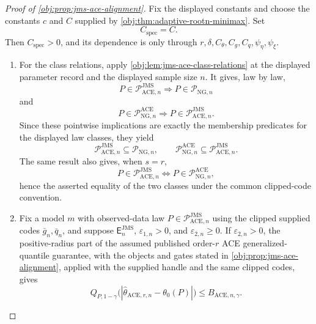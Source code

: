 \begin{proof}[Proof of \cref{obj:prop:jms-ace-alignment}]
Fix the displayed constants and choose the constants \(c\) and \(C\) supplied by
\cref{obj:thm:adaptive-rootn-minimax}.  Set
\[
  C_{\mathrm{spec}}=C .
\]
Then \(C_{\mathrm{spec}}>0\), and its dependence is only through
\(r,\delta,C_{\theta},C_g,C_q,\psi_{\eta},\psi_{\xi}\).

\begin{enumerate}
\item For the class relations, apply \cref{obj:lem:jms-ace-class-relations} at
the displayed parameter record and the displayed sample size \(n\).  It gives,
law by law,
\[
  P\in\mathcal P_{\mathrm{ACE},n}^{\mathrm{JMS}}
  \Longrightarrow
  P\in\mathcal P_{\mathrm{NG},n}
\]
and
\[
  P\in\mathcal P_{\mathrm{NG},n}^{\mathrm{ACE}}
  \Longrightarrow
  P\in\mathcal P_{\mathrm{ACE},n}^{\mathrm{JMS}} .
\]
Since these pointwise implications are exactly the membership predicates for
the displayed law classes, they yield
\[
 \mathcal P_{\mathrm{ACE},n}^{\mathrm{JMS}}
 \subseteq \mathcal P_{\mathrm{NG},n},
 \qquad
 \mathcal P_{\mathrm{NG},n}^{\mathrm{ACE}}
 \subseteq \mathcal P_{\mathrm{ACE},n}^{\mathrm{JMS}} .
\]
The same result also gives, when \(s=r\),
\[
  P\in\mathcal P_{\mathrm{ACE},n}^{\mathrm{JMS}}
  \Longleftrightarrow
  P\in\mathcal P_{\mathrm{NG},n}^{\mathrm{ACE}},
\]
hence the asserted equality of the two classes under the common clipped-code
convention.

\item Fix a model \(m\) with observed-data law
\(P\in\mathcal P_{\mathrm{ACE},n}^{\mathrm{JMS}}\) using the clipped supplied
codes \(\bar g_n,\bar q_n\), and suppose \(\mathsf E_n^{\mathrm{JMS}}\),
\(\varepsilon_{1,n}>0\), and \(\varepsilon_{2,n}\ge0\).  If
\(\varepsilon_{2,n}>0\), the positive-radius part of the assumed published
order-\(r\) ACE generalized-quantile guarantee, with the objects and gates
stated in \cref{obj:prop:jms-ace-alignment}, applied with the supplied handle
and the same clipped codes, gives
\[
 Q_{P,1-\gamma}
 \bigl(|\widehat\theta_{\mathrm{ACE},r,n}-\theta_0(P)|\bigr)
 \le B_{\mathrm{ACE},n,\gamma}.
\]


\end{enumerate}
\end{proof}
